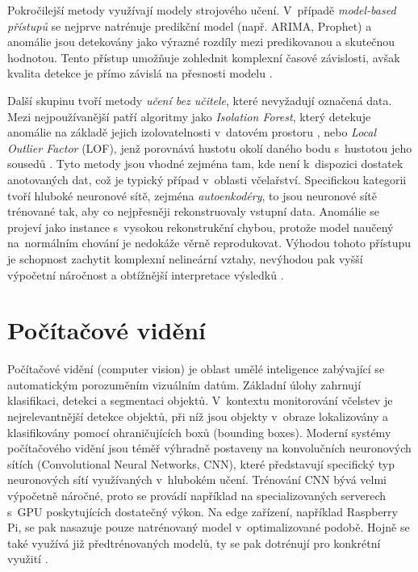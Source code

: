 Pokročilejší metody využívají modely strojového učení. V~případě \textit{model-based přístupů} se nejprve natrénuje predikční model (např. ARIMA, Prophet) a anomálie jsou detekovány jako výrazné rozdíly mezi predikovanou a skutečnou hodnotou. Tento přístup umožňuje zohlednit komplexní časové závislosti, avšak kvalita detekce je přímo závislá na přesnosti modelu \cite{Chen2022}.

Další skupinu tvoří metody \textit{učení bez učitele}, které nevyžadují označená data. Mezi nejpoužívanější patří algoritmy jako \textit{Isolation Forest}, který detekuje anomálie na základě jejich izolovatelnosti v~datovém prostoru \cite{Liu2008}, nebo \textit{Local Outlier Factor} (LOF), jenž porovnává hustotu okolí daného bodu s~hustotou jeho sousedů \cite{Chandola2009}. Tyto metody jsou vhodné zejména tam, kde není k~dispozici dostatek anotovaných dat, což je typický případ v~oblasti včelařství. Specifickou kategorii tvoří hluboké neuronové sítě, zejména \textit{autoenkodéry}, to jsou neuronové sítě trénované tak, aby co nejpřesněji rekonstruovaly vstupní data. Anomálie se projeví jako instance s~vysokou rekonstrukční chybou, protože model naučený na~normálním chování je nedokáže věrně reprodukovat. Výhodou tohoto přístupu je schopnost zachytit komplexní nelineární vztahy, nevýhodou pak vyšší výpočetní náročnost a obtížnější interpretace výsledků \cite{Chen2022}.

\section{Počítačové vidění}
Počítačové vidění (computer vision) je oblast umělé inteligence zabývající se automatickým porozuměním vizuálním datům. Základní úlohy zahrnují klasifikaci, detekci a segmentaci objektů. V~kontextu monitorování včelstev je nejrelevantnější detekce objektů, při níž jsou objekty v~obraze lokalizovány a klasifikovány pomocí ohraničujících boxů (bounding boxes). Moderní systémy počítačového vidění jsou téměř výhradně postaveny na konvolučních neuronových sítích (Convolutional Neural Networks, CNN), které představují specifický typ neuronových sítí využívaných v~hlubokém učení. Trénování CNN bývá velmi výpočetně náročné, proto se provádí například na specializovaných serverech s~GPU poskytujících dostatečný výkon. Na edge zařízení, například Raspberry Pi, se pak nasazuje pouze natrénovaný model v~optimalizované podobě. Hojně se také využívá již předtrénovaných modelů, ty se pak dotrénují pro konkrétní využití \cite{Bilik2024}.

